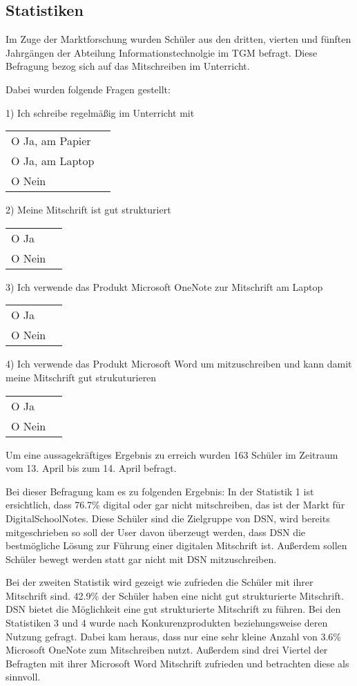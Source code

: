 
\subsection{Statistiken}
Im Zuge der Marktforschung wurden Schüler aus den dritten, vierten und fünften Jahrgängen der Abteilung Informationstechnolgie im TGM befragt. Diese Befragung bezog sich auf das Mitschreiben im Unterricht. 

Dabei wurden folgende Fragen gestellt:

1) Ich schreibe regelmäßig im Unterricht mit\\
	\begin{tabular}[t]{lr}
	O Ja, am Papier\\
	O Ja, am Laptop\\
	O Nein
	\end{tabular}
	

2) Meine Mitschrift ist gut strukturiert\\
	\begin{tabular}[t]{lr}
	O Ja\\
	O Nein
	\end{tabular}

3) Ich verwende das Produkt Microsoft OneNote zur Mitschrift am Laptop\\
	\begin{tabular}[t]{lr}
	O Ja\\
	O Nein
	\end{tabular}
	
4) Ich verwende das Produkt Microsoft Word um mitzuschreiben und kann damit meine Mitschrift gut strukuturieren\\
	\begin{tabular}[t]{lr}
	O Ja\\
	O Nein
	\end{tabular}
	
Um eine aussagekräftiges Ergebnis zu erreich wurden 163 Schüler im Zeitraum vom 13. April bis zum 14. April befragt.
\newpage

Bei dieser Befragung kam es zu folgenden Ergebnis:
In der Statistik 1 ist ersichtlich, dass 76.7\% digital oder gar nicht mitschreiben, das ist der Markt für DigitalSchoolNotes.
Diese Schüler sind die Zielgruppe von DSN, wird bereits mitgeschrieben so soll der User davon überzeugt werden, dass DSN die bestmögliche Lösung zur Führung einer digitalen Mitschrift ist. Außerdem sollen Schüler bewegt werden statt gar nicht mit DSN mitzuschreiben.

Bei der zweiten Statistik wird gezeigt wie zufrieden die Schüler mit ihrer Mitschrift sind. 42.9\% der Schüler haben eine nicht gut strukturierte Mitschrift. DSN bietet die Möglichkeit eine gut strukturierte Mitschrift zu führen. 
Bei den Statistiken 3 und 4 wurde nach Konkurenzprodukten beziehungsweise deren Nutzung gefragt. Dabei kam heraus, dass nur eine sehr kleine Anzahl von 3.6\% Microsoft OneNote zum Mitschreiben nutzt. Außerdem sind drei Viertel der Befragten mit ihrer Microsoft Word Mitschrift zufrieden und betrachten diese als sinnvoll. 
\newpage
